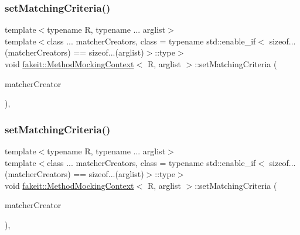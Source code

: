 \mbox{\label{classfakeit_1_1MethodMockingContext_ab6bf85e9f9f5e5eeb2766ec487a42e20}} 
\subsubsection{\texorpdfstring{setMatchingCriteria()}{setMatchingCriteria()}\hspace{0.1cm}{\footnotesize\ttfamily [19/27]}}
{\footnotesize\ttfamily template$<$typename R, typename ... arglist$>$ \\
template$<$class ... matcher\+Creators, class  = typename std\+::enable\+\_\+if$<$                sizeof...(matcher\+Creators) == sizeof...(arglist)$>$\+::type$>$ \\
void \mbox{\hyperlink{classfakeit_1_1MethodMockingContext}{fakeit\+::\+Method\+Mocking\+Context}}$<$ R, arglist $>$\+::set\+Matching\+Criteria (\begin{DoxyParamCaption}\item[{const matcher\+Creators \&...}]{matcher\+Creator }\end{DoxyParamCaption})\hspace{0.3cm}{\ttfamily [inline]}, {\ttfamily [protected]}}

\mbox{\label{classfakeit_1_1MethodMockingContext_ab6bf85e9f9f5e5eeb2766ec487a42e20}} 
\subsubsection{\texorpdfstring{setMatchingCriteria()}{setMatchingCriteria()}\hspace{0.1cm}{\footnotesize\ttfamily [20/27]}}
{\footnotesize\ttfamily template$<$typename R, typename ... arglist$>$ \\
template$<$class ... matcher\+Creators, class  = typename std\+::enable\+\_\+if$<$                sizeof...(matcher\+Creators) == sizeof...(arglist)$>$\+::type$>$ \\
void \mbox{\hyperlink{classfakeit_1_1MethodMockingContext}{fakeit\+::\+Method\+Mocking\+Context}}$<$ R, arglist $>$\+::set\+Matching\+Criteria (\begin{DoxyParamCaption}\item[{const matcher\+Creators \&...}]{matcher\+Creator }\end{DoxyParamCaption})\hspace{0.3cm}{\ttfamily [inline]}, {\ttfamily [protected]}}

